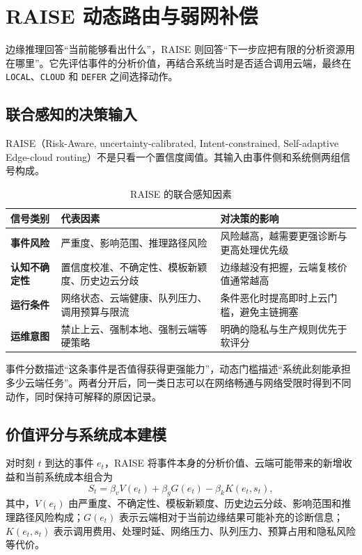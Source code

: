 \chapter{RAISE 动态路由与弱网补偿}

边缘推理回答“当前能够看出什么”，RAISE 则回答“下一步应把有限的分析资源用在哪里”。它先评估事件的分析价值，再结合系统当时是否适合调用云端，最终在 \texttt{LOCAL}、\texttt{CLOUD} 和 \texttt{DEFER} 之间选择动作。

\section{联合感知的决策输入}
RAISE（Risk-Aware, uncertainty-calibrated, Intent-constrained, Self-adaptive Edge-cloud routing）不是只看一个置信度阈值。其输入由事件侧和系统侧两组信号构成。

\begin{table}[htbp]
  \centering
  \small
  \caption{RAISE 的联合感知因素}
  \label{tab:raise-inputs}
  \begin{tabularx}{\textwidth}{>{\bfseries}p{} p{} X}
    \toprule
    信号类别 & 代表因素 & 对决策的影响 \\
    \midrule
    事件风险 & 严重度、影响范围、推理路径风险 & 风险越高，越需要更强诊断与更高处理优先级 \\
    认知不确定性 & 置信度校准、不确定性、模板新颖度、历史边云分歧 & 边缘越没有把握，云端复核价值通常越高 \\
    运行条件 & 网络状态、云端健康、队列压力、调用预算与限流 & 条件恶化时提高即时上云门槛，避免主链拥塞 \\
    运维意图 & 禁止上云、强制本地、强制云端等硬策略 & 明确的隐私与生产规则优先于软评分 \\
    \bottomrule
  \end{tabularx}
\end{table}

事件分数描述“这条事件是否值得获得更强能力”，动态门槛描述“系统此刻能承担多少云端任务”。两者分开后，同一类日志可以在网络畅通与网络受限时得到不同动作，同时保持可解释的原因记录。

\section{价值评分与系统成本建模}
对时刻 $t$ 到达的事件 $e_t$，RAISE 将事件本身的分析价值、云端可能带来的新增收益和当前系统成本组合为
\begin{equation}
  S_t = \beta_v V(e_t) + \beta_g G(e_t) - \beta_k K(e_t,s_t),
  \label{eq:raise-score-v03}
\end{equation}
其中，$V(e_t)$ 由严重度、不确定性、模板新颖度、历史边云分歧、影响范围和推理路径风险构成；$G(e_t)$ 表示云端相对于当前边缘结果可能补充的诊断信息；$K(e_t,s_t)$ 表示调用费用、处理时延、网络压力、队列压力、预算占用和隐私风险等代价。

